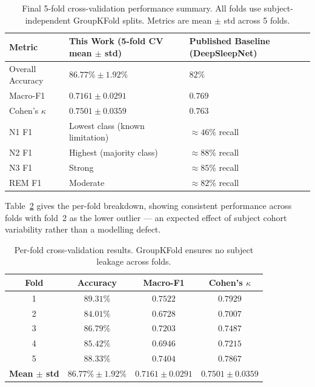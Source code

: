 \documentclass[10pt]{article}
\begin{document}
\begin{table}[h]
\centering
\small
\renewcommand{\arraystretch}{1.2}
\begin{tabular}{|l|l|l|}
\hline
\textbf{Metric} & \textbf{This Work (5-fold CV mean $\pm$ std)} & \textbf{Published Baseline (DeepSleepNet)} \\\hline
Overall Accuracy & $86.77\% \pm 1.92\%$ & $82\%$ \\\hline
Macro-F1 & $0.7161 \pm 0.0291$ & $0.769$ \\\hline
Cohen's $\kappa$ & $0.7501 \pm 0.0359$ & $0.763$ \\\hline
N1 F1 & Lowest class (known limitation) & $\approx 46\%$ recall \\\hline
N2 F1 & Highest (majority class) & $\approx 88\%$ recall \\\hline
N3 F1 & Strong & $\approx 85\%$ recall \\\hline
REM F1 & Moderate & $\approx 82\%$ recall \\\hline
\end{tabular}
\caption{Final 5-fold cross-validation performance summary. All folds use subject-independent GroupKFold splits. Metrics are mean $\pm$ std across 5 folds.}
\label{tab:perf}
\end{table}

Table~\ref{tab:fold-breakdown} gives the per-fold breakdown, showing consistent performance across folds with fold~2 as the lower outlier — an expected effect of subject cohort variability rather than a modelling defect.

\begin{table}[h]
\centering
\small
\renewcommand{\arraystretch}{1.2}
\begin{tabular}{|c|c|c|c|}
\hline
\textbf{Fold} & \textbf{Accuracy} & \textbf{Macro-F1} & \textbf{Cohen's $\kappa$} \\\hline
1 & $89.31\%$ & $0.7522$ & $0.7929$ \\\hline
2 & $84.01\%$ & $0.6728$ & $0.7007$ \\\hline
3 & $86.79\%$ & $0.7203$ & $0.7487$ \\\hline
4 & $85.42\%$ & $0.6946$ & $0.7215$ \\\hline
5 & $88.33\%$ & $0.7404$ & $0.7867$ \\\hline
\textbf{Mean $\pm$ std} & $\mathbf{86.77\% \pm 1.92\%}$ & $\mathbf{0.7161 \pm 0.0291}$ & $\mathbf{0.7501 \pm 0.0359}$ \\\hline
\end{tabular}
\caption{Per-fold cross-validation results. GroupKFold ensures no subject leakage across folds.}
\label{tab:fold-breakdown}
\end{table}
\end{document}
